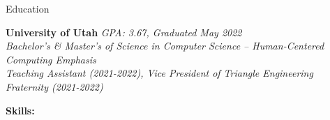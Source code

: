 \documentclass{resume}
\begin{document}
\begin{rSection}{Education}

{\bf University of Utah} \hfill {\em GPA: 3.67, Graduated May 2022}
\vspace{2pt}
\emph{
    \\ Bachelor's \& Master's of Science in Computer Science -- Human-Centered Computing Emphasis
    \\ Teaching Assistant (2021-2022), Vice President of Triangle Engineering Fraternity (2021-2022)
}

%
%
%
%
%
%
%   
%
%
%
%

%
%
\vspace{-0.3em}
{\bf Skills:}
\vspace{-1.83em}


\end{rSection}
\end{document}
